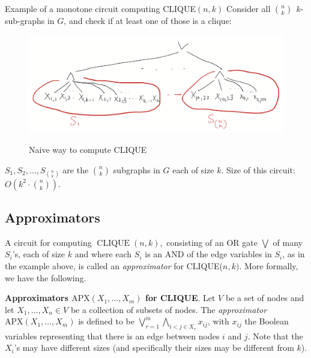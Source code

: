 \begin{trailer}{Example of a monotone circuit computing CLIQUE$(n, k)$}
Consider  all $\binom{n}{k} ~~ k$-sub-graphs in $G$, and check if at least one of those is a clique:

\begin{figure}
    \centering
    \includegraphics[width=0.75\linewidth]{images/k-clique-simple-circuit.png}
    \label{fig:clique-naive}
    \caption{Naive way to compute CLIQUE}
\end{figure}

$S_1, S_2, \ldots, S_{\binom{n}{k}}$ are the $\binom{n}{k}$ subgraphs in $G$ each of size $k$.
Size of this circuit: $O\left(k^2 \cdot\binom{n}{k}\right)$.
\end{trailer}


\newcommand{\APPX}{\ensuremath{\mathrm{APX}}}



\subsection{Approximators}

A  circuit for computing $\operatorname{CLIQUE}  (n, k),$ consisting of an OR gate $\bigvee$ of many  $S_i$'s, each of size $k$ and where each $S_i$ is an AND of the edge variables in $S_i$, as in the example above, is called an \textit{approximator} for CLIQUE($n, k)$. More formally, we have the following. 


\begin{tcolorbox}[colframe=white, colback=red!5, boxrule=0mm, sharp corners]
\textbf{Approximators $\APPX\left(X_1, \ldots, X_m\right)$ for CLIQUE}.
Let $V$ be a set of nodes and let $X_1,\dots,X_n\in V$ be a collection of subsets of nodes. The \emph{approximator} $\APPX\left(X_1, \ldots, X_m\right)$ is defined to be 
$\bigvee_{r=1}^m\bigwedge_{i<j \in X_r} x_{ij}$, with $x_{ij}$ the Boolean variables representing that there is an edge between nodes $i$ and $j$.
Note that the $X_i$'s may have different sizes (and specifically their sizes may be different from $k$).
\end{tcolorbox}
 
